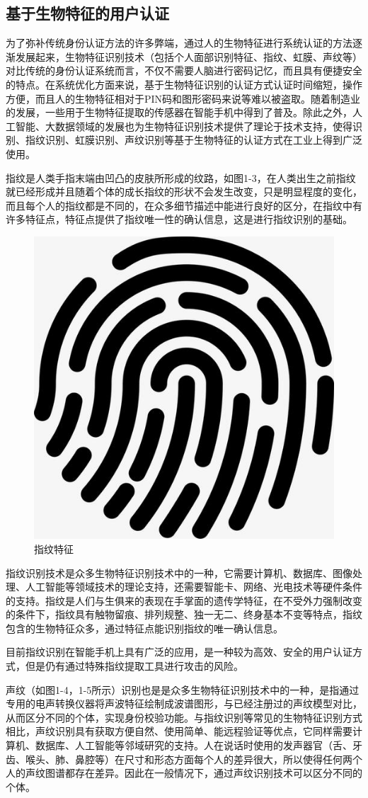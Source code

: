 \subsection{基于生物特征的用户认证}
{为了弥补传统身份认证方法的许多弊端，通过人的生物特征进行系统认证的方法逐渐发展起来，生物特征识别技术（包括个人面部识别特征、指纹、虹膜、声纹等）对比传统的身份认证系统而言，不仅不需要人脑进行密码记忆，而且具有便捷安全的特点\cite{2023he}。在系统优化方面来说，基于生物特征识别的认证方式认证时间缩短，操作方便，而且人的生物特征相对于PIN码和图形密码来说等难以被盗取。随着制造业的发展，一些用于生物特征提取的传感器在智能手机中得到了普及。除此之外，人工智能、大数据领域的发展也为生物特征识别技术提供了理论于技术支持，使得识别、指纹识别、虹膜识别、声纹识别等基于生物特征的认证方式在工业上得到广泛使用。}
\par
{指纹是人类手指末端由凹凸的皮肤所形成的纹路，如图1-3，在人类出生之前指纹就已经形成并且随着个体的成长指纹的形状不会发生改变，只是明显程度的变化，而且每个人的指纹都是不同的，在众多细节描述中能进行良好的区分，在指纹中有许多特征点，特征点提供了指纹唯一性的确认信息，这是进行指纹识别的基础\cite{2019yu}。}
\begin{figure}[htbp]
  \centering
  \includegraphics[width=0.2\linewidth]{images/zhi.jpeg}
  \caption{指纹特征}\label{1-3} %
\end{figure}
\par
{指纹识别技术是众多生物特征识别技术中的一种，它需要计算机、数据库、图像处理、人工智能等领域技术的理论支持，还需要智能卡、网络、光电技术等硬件条件的支持。指纹是人们与生俱来的表现在手掌面的遗传学特征，在不受外力强制改变的条件下，指纹具有触物留痕、排列规整、独一无二、终身基本不变等特点，指纹包含的生物特征众多，通过特征点能识别指纹的唯一确认信息\cite{2019yu}。}
\par
{目前指纹识别在智能手机上具有广泛的应用，是一种较为高效、安全的用户认证方式，但是仍有通过特殊指纹提取工具进行攻击的风险。}
\par
{声纹（如图1-4，1-5所示）识别也是是众多生物特征识别技术中的一种，是指通过专用的电声转换仪器将声波特征绘制成波谱图形，与已经注册过的声纹模型对比，从而区分不同的个体，实现身份校验功能。与指纹识别等常见的生物特征识别方式相比，声纹识别具有获取方便自然、使用简单、能远程验证等优点，它同样需要计算机、数据库、人工智能等邻域研究的支持。人在说话时使用的发声器官（舌、牙齿、喉头、肺、鼻腔等）在尺寸和形态方面每个人的差异很大，所以使得任何两个人的声纹图谱都存在差异\cite{2022zhang}。因此在一般情况下，通过声纹识别技术可以区分不同的个体。}
